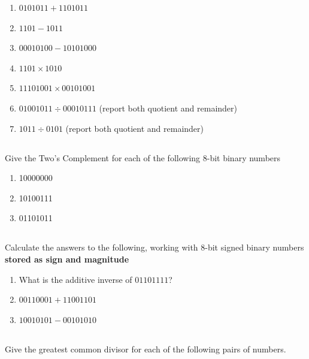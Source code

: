 \documentclass[twocolumn]{article}
\newcommand\mrk[1]{}
\begin{document}
    \begin{enumerate}
        \item $0101011 + 1101011$ \mrk{1}
        \item $1101 - 1011$ \mrk{1}
        \item $00010100 - 10101000$ \mrk{1}
        \item $1101 \times 1010$ \mrk{1}
        \item $11101001 \times 00101001$ \mrk{1}
        \item $01001011 \div 00010111$ (report both quotient and remainder) \mrk{1}
        \item $1011\div 0101$ (report both quotient and remainder) \mrk{1}
    \end{enumerate}

\subsection{}

    Give the Two’s Complement for each of the following 8-bit binary numbers
        
    \begin{enumerate}
        \item 10000000 \mrk{1}
        \item 10100111 \mrk{1}
        \item 01101011 \mrk{1}
    \end{enumerate}

\subsection{}

    Calculate the answers to the following, working with 8-bit signed binary numbers \textbf{stored as sign and magnitude}

    \begin{enumerate}
        \item What is the additive inverse of $01101111$? \mrk{1}
        \item $00110001 + 11001101$ \mrk{1}
        \item $10010101 - 00101010$ \mrk{1}
    \end{enumerate}

\subsection{}

   Give the greatest common divisor for each of the following pairs of numbers.
\end{document}
